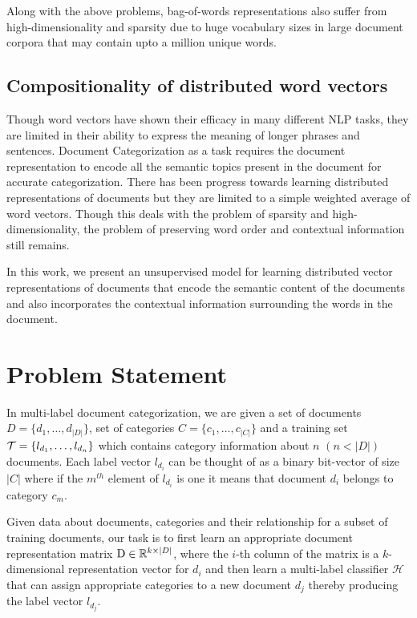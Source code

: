 Along with the above problems, bag-of-words representations 
also suffer from high-dimensionality and sparsity due to huge 
vocabulary sizes in large document corpora that may contain upto a 
million unique words.

\subsection{Compositionality of distributed word vectors}
Though word vectors have shown their efficacy in many different NLP 
tasks, they are limited in their ability to express the meaning of 
longer phrases and sentences. Document Categorization as a task 
requires the document representation to encode all the semantic topics 
present in the document for accurate categorization. There has been 
progress towards learning distributed representations of documents but 
they are limited to a simple weighted average of word vectors. Though 
this deals with the problem of sparsity and high-dimensionality, the 
problem of preserving word order and contextual information still remains.

In this work, we present an unsupervised model for learning 
distributed vector representations of documents that encode the semantic content of the documents and also incorporates the contextual information surrounding the words in the document.

\section{Problem Statement}	
In multi-label document categorization, we are given a set of documents $D = \{d_{1}, \ldots, d_{|D|}\}$, set of categories $C = \{c_{1}, \ldots, c_{|C|}\}$ and a training set $\mathcal{T} = \{l_{d_{1}}, \ldots, l_{d_{n}}\}$ which contains category information about $n$ $(n < |D|)$ documents. Each label vector $l_{d_{i}}$ can be thought of as a binary bit-vector of size $|C|$ where if the $m^{th}$ element of $l_{d_{i}}$ is one it means that document $d_{i}$ belongs to category $c_{m}$.  

Given data about documents, categories and their relationship for a 
subset of training documents, our task is to first learn an appropriate 
document representation matrix $\mathrm{D} \in \mathbb{R}^{k \times |D|}$, 
where the $i$-th column of the matrix is a $k$-dimensional 
representation vector for $d_{i}$ and then learn a multi-label classifier 
$\mathcal{H}$ that can assign appropriate categories to a new document $d_{j}$  thereby producing the label vector $l_{d_{j}}$.

